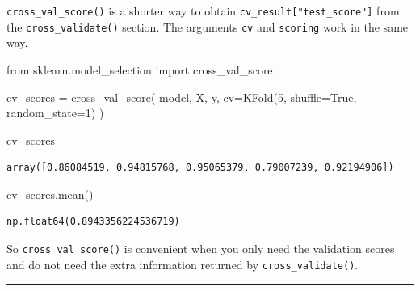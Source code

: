 \documentclass[
  letterpaper,
  DIV=11,
  numbers=noendperiod]{scrreprt}
\newenvironment{Shaded}{\begin{snugshade}}{\end{snugshade}}
\newcommand{\DecValTok}[1]{\textcolor[rgb]{0.68,0.00,0.00}{#1}}
\newcommand{\ImportTok}[1]{\textcolor[rgb]{0.00,0.46,0.62}{#1}}
\newcommand{\NormalTok}[1]{\textcolor[rgb]{0.00,0.23,0.31}{#1}}
\newcommand{\OperatorTok}[1]{\textcolor[rgb]{0.37,0.37,0.37}{#1}}
\newcommand{\VariableTok}[1]{\textcolor[rgb]{0.07,0.07,0.07}{#1}}
\theoremstyle{definition}
\theoremstyle{definition}
\theoremstyle{plain}
\theoremstyle{plain}
\theoremstyle{remark}
\begin{document}
\begin{tcolorbox}[enhanced jigsaw, arc=.35mm, bottomrule=.15mm, bottomtitle=1mm, breakable, colback=white, colbacktitle=quarto-callout-note-color!10!white, colframe=quarto-callout-note-color-frame, coltitle=black, left=2mm, leftrule=.75mm, opacityback=0, opacitybacktitle=0.6, rightrule=.15mm, title=\textcolor{quarto-callout-note-color}{\faInfo}\hspace{0.5em}{\texttt{cross\_val\_score}}, titlerule=0mm, toprule=.15mm, toptitle=1mm]

\texttt{cross\_val\_score()} is a shorter way to obtain
\texttt{cv\_result{[}"test\_score"{]}} from the
\texttt{cross\_validate()} section. The arguments \texttt{cv} and
\texttt{scoring} work in the same way.

\begin{Shaded}
\begin{Highlighting}[]
\ImportTok{from}\NormalTok{ sklearn.model\_selection }\ImportTok{import}\NormalTok{ cross\_val\_score}

\NormalTok{cv\_scores }\OperatorTok{=}\NormalTok{ cross\_val\_score(}
\NormalTok{    model, X, y, cv}\OperatorTok{=}\NormalTok{KFold(}\DecValTok{5}\NormalTok{, shuffle}\OperatorTok{=}\VariableTok{True}\NormalTok{, random\_state}\OperatorTok{=}\DecValTok{1}\NormalTok{)}
\NormalTok{)}

\NormalTok{cv\_scores}
\end{Highlighting}
\end{Shaded}

\begin{verbatim}
array([0.86084519, 0.94815768, 0.95065379, 0.79007239, 0.92194906])
\end{verbatim}

\begin{Shaded}
\begin{Highlighting}[]
\NormalTok{cv\_scores.mean()}
\end{Highlighting}
\end{Shaded}

\begin{verbatim}
np.float64(0.8943356224536719)
\end{verbatim}

So \texttt{cross\_val\_score()} is convenient when you only need the
validation scores and do not need the extra information returned by
\texttt{cross\_validate()}.

\end{tcolorbox}

\begin{center}\rule{0.5\linewidth}{0.5pt}\end{center}
\end{document}
